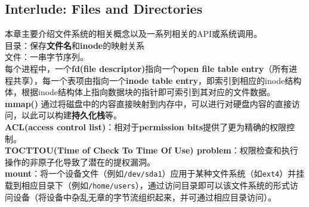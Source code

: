 \documentclass{article}
\begin{document}
\subsection{Interlude: Files and Directories}
本章主要介绍文件系统的相关概念以及一系列相关的API或系统调用。\\
目录：保存\textbf{文件名}和\textbf{inode}的映射关系 \\
文件：一串字节序列。\\
每个进程中，一个\textbf{fd(file descriptor)}指向一个\textbf{open file table entry}（所有进程共享），每一个表项由指向一个\textbf{inode table entry}，即索引到相应的inode结构体，根据inode结构体上指向数据块的指针即可索引到其对应的文件数据。\\
\textbf{mmap()} 通过将磁盘中的内容直接映射到内存中，可以进行对硬盘内容的直接访问，以此可以构建\textbf{持久化栈}等。 \\
\textbf{ACL(access control list)}：相对于\textbf{permission bits}提供了更为精确的权限控制。 \\
\textbf{TOCTTOU(Time of Check To Time Of Use) problem}：权限检查和执行操作的非原子化导致了潜在的提权漏洞。 \\
\textbf{mount}：将一个设备文件（例如\texttt{/dev/sda1}）应用于某种文件系统（如\texttt{ext4}）并挂载到相应目录下（例如\texttt{/home/users}），通过访问目录即可以该文件系统的形式访问设备（将设备中杂乱无章的字节流组织起来，并可通过相应目录访问）。
\end{document}
